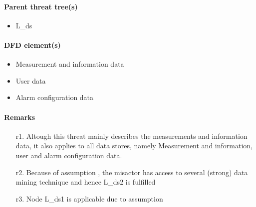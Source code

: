 \paragraph{Parent threat tree(s)}

\begin{itemize}
  \item L\_ds
\end{itemize}

\paragraph{DFD element(s)}

\begin{itemize}
  \item Measurement and information data
  \item User data
  \item Alarm configuration data
\end{itemize}

\paragraph{Remarks}

	\begin{enumerate}
         \item[r1.] Altough this threat mainly describes the measurements
         and information data, it also applies to all data stores, namely
         Measurement and information, user and alarm configuration data.
         \item[r2.] Because of assumption %
		 , the misactor has access to several (strong) data mining technique and hence
		 L\_ds2 is fulfilled
         \item[r3.] Node L\_ds1 is applicable due to assumption %
    \end{enumerate}
